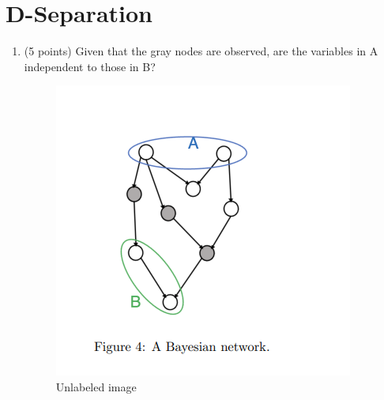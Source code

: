 \documentclass[a3paper,12pt]{extarticle} %
\begin{document}
\section{ D-Separation}
\begin{enumerate}
    \item (5 points) Given that the gray nodes are observed, are the variables in A independent to those in B?
    \begin{figure}[h!]
        \centering
        \begin{minipage}{0.48\textwidth}
            \centering
            \includegraphics[width=\linewidth]{dseperation_1.png}
            \caption{Unlabeled image}
            \label{fig:example_image1}
        \end{minipage}
        \hfill
        \begin{minipage}{0.48\textwidth}
            \centering

\end{minipage}
\end{figure}
\end{enumerate}
\end{document}
